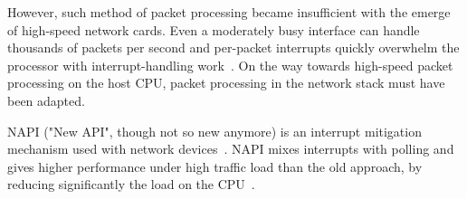 However, such method of packet processing became insufficient with the emerge of high-speed network cards.
Even a moderately busy interface can handle thousands of packets per second
and per-packet interrupts quickly overwhelm the processor with interrupt-handling work~\cite{low-latency-ethernet-device-polling}.
On the way towards high-speed packet processing on the host CPU,
packet processing in the network stack must have been adapted.

NAPI ("New API", though not so new anymore)
is an interrupt mitigation mechanism used with network devices~\cite{reworking-napi}.
NAPI mixes interrupts with polling and gives higher performance under high traffic load
than the old approach, by reducing significantly the load on the CPU~\cite{understanding-internals}.




